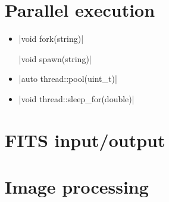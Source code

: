 \documentclass[12pt]{report}
\begin{document}
\section{Parallel execution \label{SEC:support:thread}}

\begin{itemize}
\item \cppinline|void fork(string)| 

\cppinline|void spawn(string)| 

\item \cppinline|auto thread::pool(uint_t)| 

\item \cppinline|void thread::sleep_for(double)| 
\end{itemize}

\section{FITS input/output \label{SEC:support:fits}}

\section{Image processing \label{SEC:support:image}}
\end{document}
